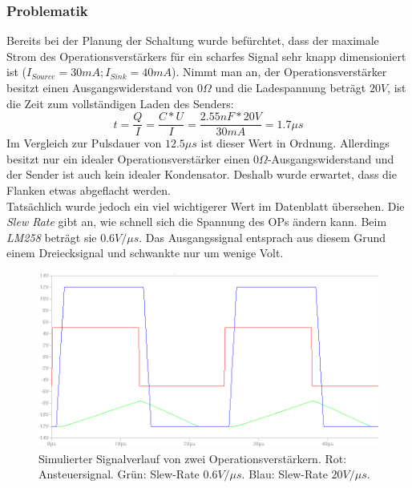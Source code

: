 \subsubsection{Problematik}
Bereits bei der Planung der Schaltung wurde befürchtet, dass der maximale Strom des Operationsverstärkers für ein scharfes Signal sehr knapp dimensioniert ist ($I_{Source}=30mA; I_{Sink}=40mA$). Nimmt man an, der Operationsverstärker besitzt einen Ausgangswiderstand von $0 \Omega$ und die Ladespannung beträgt $20V$, ist die Zeit zum vollständigen Laden des Senders:
\begin{equation}
t=\frac{Q}{I}=\frac{C*U}{I}=\frac{2.55nF*20V}{30mA}=1.7\mu s
\end{equation}
Im Vergleich zur Pulsdauer von $12.5\mu s$ ist dieser Wert in Ordnung. Allerdings besitzt nur ein idealer Operationsverstärker einen $0\Omega$-Ausgangswiderstand und der Sender ist auch kein idealer Kondensator. Deshalb wurde erwartet, dass die Flanken etwas abgeflacht werden.\\
Tatsächlich wurde jedoch ein viel wichtigerer Wert im Datenblatt übersehen. Die \textit{Slew Rate} gibt an, wie schnell sich die Spannung des OPs ändern kann. Beim \textit{LM258} beträgt sie $0.6V/\mu s$. Das Ausgangssignal entsprach aus diesem Grund einem Dreiecksignal und schwankte nur um wenige Volt.
\begin{figure}[H] %
\centering
\includegraphics[scale=0.6]{images/signalverlauf_opamps.png}
\caption{Simulierter Signalverlauf von zwei Operationsverstärkern. Rot: Ansteuersignal. Grün: Slew-Rate $0.6V/\mu s$. Blau: Slew-Rate $20V/\mu s$.} \label{img:I2}
\end{figure}

